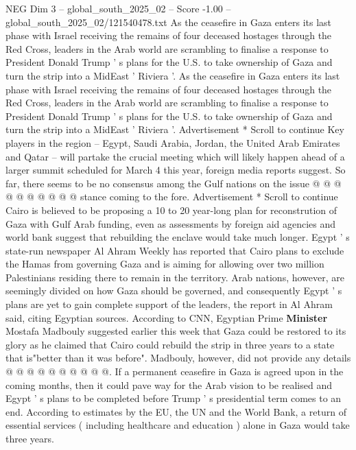 \begin{textsample}{NEG Dim 3 – global\_south\_2025\_02 – Score -1.00 – global\_south\_2025\_02/121540478.txt}  \label{ex:f3_neg_012}
As the ceasefire in Gaza enters its last phase with Israel receiving the remains of four deceased hostages through the Red Cross, leaders in the Arab world are scrambling to finalise a response to President Donald Trump ' s plans for the U.S. to take ownership of Gaza and turn the strip into a MidEast ' Riviera '.
As the ceasefire in Gaza enters its last phase with Israel receiving the remains of four deceased hostages through the Red Cross, leaders in the Arab world are scrambling to finalise a response to President Donald Trump ' s plans for the U.S. to take ownership of Gaza and turn the strip into a MidEast ' Riviera '.
Advertisement * Scroll to continue Key players in the region -- Egypt, Saudi Arabia, Jordan, the United Arab Emirates and Qatar -- will partake the crucial meeting which will likely happen ahead of a larger summit scheduled for March 4 this year, foreign media reports suggest.
So far, there seems to be no consensus among the Gulf nations on the issue @ @ @ @ @ @ @ @ @ @ stance coming to the fore.
Advertisement * Scroll to continue Cairo is believed to be proposing a 10 to 20 year-long plan for reconstrution of Gaza with Gulf Arab funding, even as assessments by foreign aid agencies and world bank suggest that rebuilding the enclave would take much longer.
Egypt ' s state-run newspaper Al Ahram Weekly has reported that Cairo plans to exclude the Hamas from governing Gaza and is aiming for allowing over two million Palestinians residing there to remain in the territory.
Arab nations, however, are seemingly divided on how Gaza should be governed, and consequently Egypt ' s plans are yet to gain complete support of the leaders, the report in Al Ahram said, citing Egyptian sources.
According to CNN, Egyptian Prime \textbf{Minister} Mostafa Madbouly suggested earlier this week that Gaza could be restored to its glory as he claimed that Cairo could rebuild the strip in three years to a state that is"better than it was before".
Madbouly, however, did not provide any details @ @ @ @ @ @ @ @ @ @.
If a permanent ceasefire in Gaza is agreed upon in the coming months, then it could pave way for the Arab vision to be realised and Egypt ' s plans to be completed before Trump ' s presidential term comes to an end.
According to estimates by the EU, the UN and the World Bank, a return of essential services ( including healthcare and education ) alone in Gaza would take three years.

\end{textsample}
